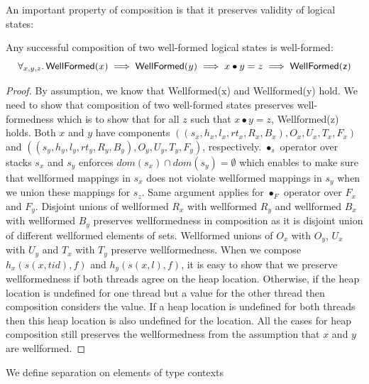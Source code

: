 An important property of composition is that it preserves validity of logical states:
\begin{lemma}
\label{lem:wf-compositionap}
Any successful composition of two well-formed logical states is well-formed:\[\forall_{x,y,z}\ldotp \mathsf{WellFormed}(x) \implies \mathsf{WellFormed}(y) \implies x\bullet y = z \implies \mathsf{WellFormed(z)}\]
\end{lemma}
\begin{proof}
By assumption, we know that \textsf{Wellformed}(x) and \textsf{Wellformed}(y) hold. We need to show that composition of two well-formed states preserves well-formedness which is to show that for all $z$ such that $x\bullet y = z$, \textsf{Wellformed}(z) holds.
  Both $x$ and $y$ have components $((s_x,h_x,l_x,rt_x,R_x,B_x),O_x,U_x,T_x,F_x)$ and $((s_y,h_y,l_y,rt_y,R_y,B_y),O_y,U_y,T_y,F_y)$, respectively. $\bullet_s$ operator over stacks $s_x$ and $s_y$ enforces $dom(s_x) \cap dom(s_y) = \emptyset$ which enables to make sure that wellformed mappings in $s_x$ does not violate wellformed mappings in $s_y$ when we union these mappings for $s_z$. Same argument applies for $\bullet_F$ operator over $F_x$ and $F_y$. Disjoint unions of wellformed $R_x$ with wellformed $R_y$ and wellformed $B_x$ with wellformed $B_y$ preserves wellformedness in composition as it is disjoint union of different wellformed elements of sets. Wellformed unions of $O_x$ with $O_y$,  $U_x$ with $U_y$  and $T_x$ with $T_y$ preserve wellformedness. When we compose $h_x(s(x,tid),f)$ and $h_y(s(x,l),f)$, it is easy to show that we preserve wellformedness if both threads agree on the heap location. Otherwise, if the heap location is undefined for one thread but a value for the other thread then composition considers the value. If a heap location is undefined for both threads then this heap location is also undefined for the location. All the cases for heap composition still preserves the wellformedness from the assumption that $x$ and $y$ are wellformed. 
  \end{proof}
We define separation on elements of type contexts
